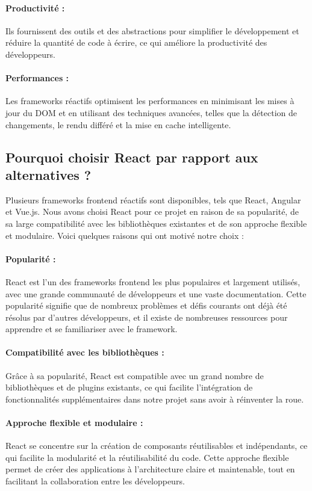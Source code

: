 \paragraph{Productivité :} Ils fournissent des outils et des abstractions pour simplifier le développement et réduire la quantité de code à écrire, ce qui améliore la productivité des développeurs.
\paragraph{Performances :} Les frameworks réactifs optimisent les performances en minimisant les mises à jour du DOM et en utilisant des techniques avancées, telles que la détection de changements, le rendu différé et la mise en cache intelligente.

\subsection{Pourquoi choisir React par rapport aux alternatives ?}

Plusieurs frameworks frontend réactifs sont disponibles, tels que React, Angular et Vue.js. Nous avons choisi React pour ce projet en raison de sa popularité, de sa large compatibilité avec les bibliothèques existantes et de son approche flexible et modulaire. Voici quelques raisons qui ont motivé notre choix :

\paragraph{Popularité :} React est l'un des frameworks frontend les plus populaires et largement utilisés, avec une grande communauté de développeurs et une vaste documentation. Cette popularité signifie que de nombreux problèmes et défis courants ont déjà été résolus par d'autres développeurs, et il existe de nombreuses ressources pour apprendre et se familiariser avec le framework.
\paragraph{Compatibilité avec les bibliothèques :} Grâce à sa popularité, React est compatible avec un grand nombre de bibliothèques et de plugins existants, ce qui facilite l'intégration de fonctionnalités supplémentaires dans notre projet sans avoir à réinventer la roue.
\paragraph{Approche flexible et modulaire :} React se concentre sur la création de composants réutilisables et indépendants, ce qui facilite la modularité et la réutilisabilité du code. Cette approche flexible permet de créer des applications à l'architecture claire et maintenable, tout en facilitant la collaboration entre les développeurs.
